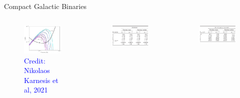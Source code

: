 \documentclass[pdf]{beamer}
\newcommand{\credit}[1]{\tiny{\textcolor{blue}{Credit: #1}}}
\begin{document}
\begin{frame}{Compact Galactic Binaries}
\begin{columns}
\begin{figure}
\includegraphics[width = \textwidth]{fig/FittingPSD.png}
\caption*{\credit{Nikolaos Karnesis et al, 2021}}
\end{figure}
\begin{figure}
\includegraphics[width = \textwidth]{fig/Table2.png}
\end{figure}
\begin{figure}
\includegraphics[width = \textwidth]{fig/Table1.png}
\end{figure}

\end{columns}
\end{frame}
\end{document}
